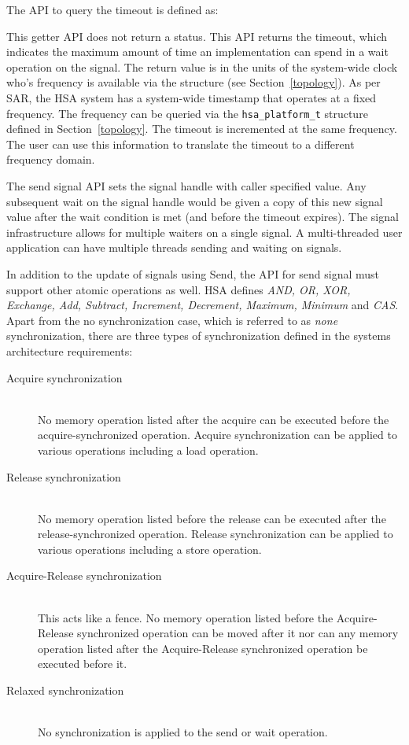 The API to query the timeout is defined as:



This getter API does not return a status.  This API returns the
timeout, which indicates the maximum amount of time an
implementation can spend in a wait operation on the signal. The
return value is in the units of 
the system-wide clock who's frequency is available via the
 structure (see Section~\ref{topology}). As
per SAR, the HSA system has a system-wide timestamp that operates at
a fixed frequency. The frequency can be
queried via the \texttt{hsa\_platform\_t} structure defined in
Section~\ref{topology}. The timeout is incremented at the same
frequency.  The user can use this information to translate the
timeout to a different frequency domain. 

The send signal API sets the signal handle with caller specified
value. Any subsequent wait on the signal handle would be given 
a copy of this new signal value after the wait condition 
is met (and before the timeout expires).  The signal infrastructure
allows for multiple waiters on a single signal. A multi-threaded
user application can have multiple threads sending and waiting on
signals. 

In addition to the update of signals using
Send, the API for send signal must support other atomic operations as
well. HSA defines \emph {AND, OR, XOR, Exchange, Add, Subtract,
Increment, Decrement, Maximum, Minimum} and \emph{CAS}. Apart from
the no synchronization case, which is referred to as \emph{none}
synchronization, there are three types of synchronization defined in
the systems architecture requirements: 

\begin{description}
        \item[Acquire synchronization] \hfill \\ 
                No memory operation listed after the acquire can be
                executed before the acquire-synchronized operation. Acquire
                synchronization can be applied to various operations
                including a load operation.
        \item[Release synchronization] \hfill \\ 
                No memory operation listed before the release can be
                executed after the release-synchronized operation. Release
                synchronization can be applied to various operations
                including a store operation.
        \item[Acquire-Release synchronization] \hfill \\
                This acts like a fence. No memory operation listed
                before the Acquire-Release synchronized operation
                can be moved after it nor can any memory operation
                listed after the Acquire-Release synchronized
                operation be executed before it.
        \item[Relaxed synchronization] \hfill \\
                No synchronization is applied to the send or wait
                operation.
\end{description}
                
